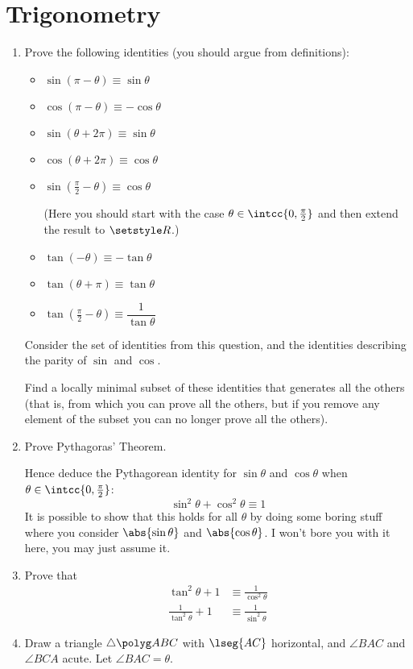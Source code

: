 \section*{Trigonometry}

\begin{enumerate}
 \item
  Prove the following identities (you should argue from definitions):
  \begin{itemize}
   \item
    \(\sin(\pi - \theta) \equiv \sin \theta\)
   \item
    \(\cos(\pi - \theta) \equiv - \cos \theta\)
   \item
    \(\sin(\theta + 2\pi) \equiv \sin \theta\)
   \item
    \(\cos(\theta + 2\pi) \equiv \cos \theta\)
   \item
    \(\sin(\frac \pi 2 - \theta) \equiv \cos \theta\)

    (Here you should start with the case \(\theta \in \intcc{0, \frac \pi 2}\)
    and then extend the result to \(\Reals\).)
   \item
    \(\tan(-\theta) \equiv -\tan \theta\)
   \item
    \(\tan(\theta + \pi) \equiv \tan \theta\)
   \item
    \(\tan(\frac \pi 2 - \theta) \equiv \dfrac 1{\tan \theta}\)
  \end{itemize}
  Consider the set of identities from this question, and the identities
  describing the parity of \(\sin\) and \(\cos\).

  Find a locally minimal subset of these identities that generates all the
  others (that is, from which you can prove all the others, but if you remove
  any element of the subset you can no longer prove all the others).
 \item
  Prove Pythagoras' Theorem.

  Hence deduce the Pythagorean identity for \(\sin \theta\) and \(\cos \theta\)
  when \(\theta \in \intcc{0, \frac \pi 2}\):
  \begin{equation*}
   \sin^2 \theta + \cos^2 \theta \equiv 1
  \end{equation*}
  It is possible to show that this holds for all \(\theta\) by doing some boring
  stuff where you consider \(\abs{\sin \theta}\) and \(\abs{\cos \theta}\). I
  won't bore you with it here, you may just assume it.
 \item
  Prove that
  \begin{align*}
   \tan^2 \theta + 1 &\equiv \frac 1{\cos^2 \theta} \\
   \frac 1{\tan^2 \theta} + 1 &\equiv \frac 1{\sin^2 \theta}
  \end{align*}
 \item
  Draw a triangle \(\tri{ABC}\) with \(\lseg{AC}\) horizontal, and
  \(\angle{BAC}\) and \(\angle{BCA}\) acute. Let \(\angle{BAC} = \theta\).


\end{enumerate}
